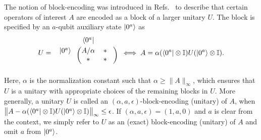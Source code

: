 The notion of block-encoding was introduced in Refs.~\cite{Low2019HamiltonianQubitize, gilyen2019qsvt} to describe that certain operators of interest $A$ are encoded as a block of a larger unitary $U$.
The block is specified by an $a$-qubit auxiliary state $|0^a\rangle$ as 
\begin{align}
        U
     = \hspace{1mm}
\begin{blockarray}{ccc}
& \bra{0^a} &  & \vspace{1mm}\\
\begin{block}{c(cc)}
  \ket{0^a} \hspace*{1mm} & A/\alpha & \hspace{0mm} * \hspace{3mm}\\
   \hspace*{1mm} & * & \hspace{0mm} * \hspace{3mm}\\
\end{block}
\end{blockarray}
\   \iff   A = \alpha(\bra{0^a} \otimes \bI)U(\ket{0^a} \otimes \bI).
\end{align}
Here, $\alpha$ is the normalization constant such that $\alpha \geq \|A\|_\infty$, which ensures that $U$ is a unitary with appropriate choices of the remaining blocks in $U$. 
More generally, a unitary $U$ is called an $(\alpha, a, \epsilon)$-block-encoding (unitary) of $A$, when $\big\|A - \alpha(\langle0^a| \otimes \mathbb{I})U(|0^a\rangle \otimes \mathbb{I})\big\|_\infty \leq \epsilon$. If $(\alpha, a, \epsilon) = (1, a, 0)$ and $a$ is clear from the context, we simply refer to $U$ as an (exact) block-encoding (unitary) of $A$ and omit $a$ from $|0^a\rangle$.





